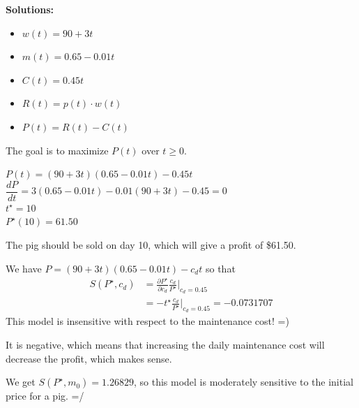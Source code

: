 \begin{solution}
\begin{slide}
\textbf{Solutions:}
\begin{parts}
	\item 
	\begin{itemize}
 		\item $w(t) = 90 + 3t$
 		\item $m(t) = 0.65-0.01t$
 		\item $C(t) = 0.45t$
 		\item $R(t) = p(t) \cdot w(t)$
 		\item $P(t) = R(t) - C(t)$
 	\end{itemize}
 	\item The goal is to maximize $P(t)$ over $t\geq 0$.
 	\item 	$P(t) = (90+3t)(0.65-0.01t) - 0.45t$ \\
			$\dfrac{dP}{dt} = 3(0.65-0.01t)-0.01(90+3t) - 0.45 = 0$\\
 			$t^\star = 10$ \\	
 			$P^\star(10) = 61.50$
 	\item The pig should be sold on day 10, which will give a profit of \$61.50.

%
	\item We have $P = (90+3t)(0.65-0.01t) - c_dt$ so that
		\begin{align*}
		S(P^\star,c_d) 
			& = \frac{\partial P^\star}{\partial c_d} \frac{c_d}{P^\star} \big|_{c_d=0.45} \\
			& = - t^\star \frac{c_d}{P^\star} \big|_{c_d=0.45}
			= -0.0731707
		\end{align*}
		This model is insensitive with respect to the maintenance cost! =)
	\item It is negative, which means that increasing the daily maintenance cost will decrease the profit, which makes sense.
	
	\item We get $S(P^\star,m_0) = 1.26829$, so
%
%
		this model is moderately sensitive to the initial price for a pig. =/
		

\end{parts}
\end{slide}
\end{solution}
